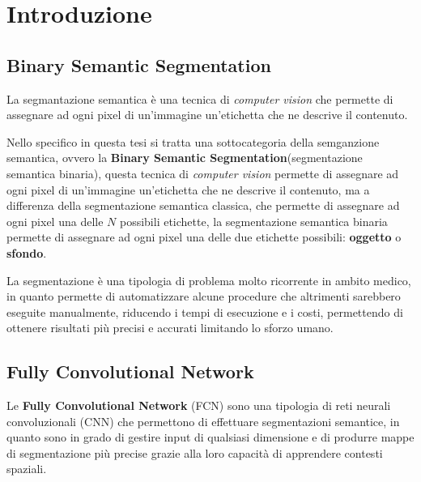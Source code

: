 

\section{Introduzione}


\subsection{Binary Semantic Segmentation}

La segmantazione semantica è una tecnica di \textit{computer vision} che permette di assegnare ad ogni pixel di un'immagine un'etichetta che ne descrive il contenuto.

Nello specifico in questa tesi si tratta una sottocategoria della semganzione semantica,
ovvero la \textbf{Binary Semantic Segmentation}(segmentazione semantica
binaria), questa tecnica di \textit{computer vision} permette di assegnare ad ogni pixel di un'immagine un'etichetta che ne descrive il contenuto, ma a differenza della segmentazione semantica classica, che permette di assegnare ad ogni pixel una delle $N$ possibili etichette, la segmentazione semantica binaria permette di assegnare ad ogni pixel una delle due etichette possibili: \textbf{oggetto} o \textbf{sfondo}.

La segmentazione \`e una tipologia di problema molto ricorrente in ambito medico, in quanto permette di automatizzare alcune procedure che altrimenti sarebbero eseguite manualmente, riducendo i tempi di esecuzione e i costi,
permettendo di ottenere risultati pi\`u precisi e accurati limitando lo sforzo umano.


\subsection{Fully Convolutional Network}

Le \textbf{Fully Convolutional Network} (FCN) \cite{long2015fully} sono una tipologia di reti neurali convoluzionali (CNN) che permettono di effettuare segmentazioni semantice, in quanto sono in grado di gestire input di qualsiasi dimensione e di produrre mappe di segmentazione pi\`u precise grazie alla loro capacit\`a di apprendere contesti spaziali.


